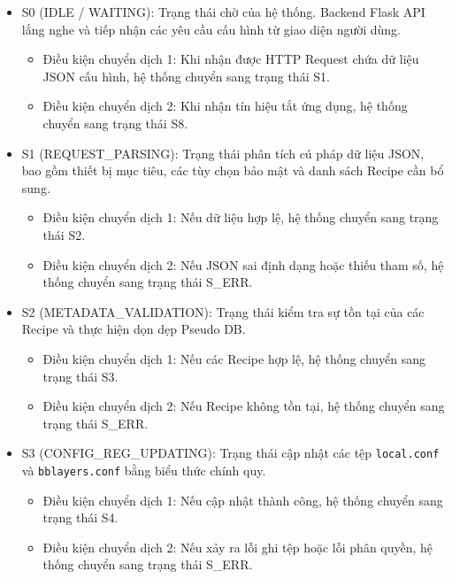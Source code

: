 \begin{itemize}
    \item S0 (IDLE / WAITING): Trạng thái chờ của hệ thống. Backend Flask API lắng nghe và tiếp nhận các yêu cầu cấu hình từ giao diện người dùng.

    \begin{itemize}
        \item Điều kiện chuyển dịch 1: Khi nhận được HTTP Request chứa dữ liệu JSON cấu hình, hệ thống chuyển sang trạng thái S1.
        \item Điều kiện chuyển dịch 2: Khi nhận tín hiệu tắt ứng dụng, hệ thống chuyển sang trạng thái S8.
    \end{itemize}

    \item S1 (REQUEST\_PARSING): Trạng thái phân tích cú pháp dữ liệu JSON, bao gồm thiết bị mục tiêu, các tùy chọn bảo mật và danh sách Recipe cần bổ sung.

    \begin{itemize}
        \item Điều kiện chuyển dịch 1: Nếu dữ liệu hợp lệ, hệ thống chuyển sang trạng thái S2.
        \item Điều kiện chuyển dịch 2: Nếu JSON sai định dạng hoặc thiếu tham số, hệ thống chuyển sang trạng thái S\_ERR.
    \end{itemize}

    \item S2 (METADATA\_VALIDATION): Trạng thái kiểm tra sự tồn tại của các Recipe và thực hiện dọn dẹp Pseudo DB.

    \begin{itemize}
        \item Điều kiện chuyển dịch 1: Nếu các Recipe hợp lệ, hệ thống chuyển sang trạng thái S3.
        \item Điều kiện chuyển dịch 2: Nếu Recipe không tồn tại, hệ thống chuyển sang trạng thái S\_ERR.
    \end{itemize}

    \item S3 (CONFIG\_REG\_UPDATING): Trạng thái cập nhật các tệp \texttt{local.conf} và \texttt{bblayers.conf} bằng biểu thức chính quy.

    \begin{itemize}
        \item Điều kiện chuyển dịch 1: Nếu cập nhật thành công, hệ thống chuyển sang trạng thái S4.
        \item Điều kiện chuyển dịch 2: Nếu xảy ra lỗi ghi tệp hoặc lỗi phân quyền, hệ thống chuyển sang trạng thái S\_ERR.
    \end{itemize}


\end{itemize}
